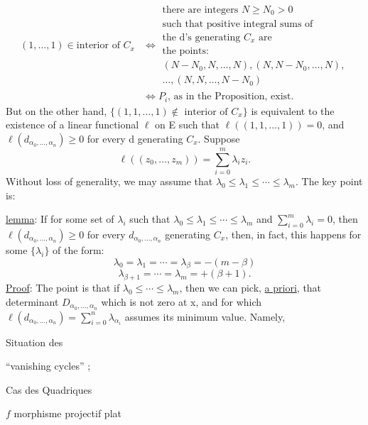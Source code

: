 \[
\begin{aligned}
(1,\ldots,1)\in\text{interior of }C_x
&\Longleftrightarrow
\begin{gathered}
\text{there are integers }N\ge N_0>0\\
\text{such that positive integral sums of}\\
\text{the d's generating }C_x\text{ are}\\
\text{the points:}\\
(N-N_0,N,\ldots,N),(N,N-N_0,\ldots,N),\\
\ldots,(N,N,\ldots,N-N_0)
\end{gathered}\\
&\Longleftrightarrow
P_i\text{, as in the Proposition, exist.}
\end{aligned}
\]
But on the other hand, $\{(1,1,\ldots,1)\notin\text{ interior of }C_x\}$ is
equivalent to the existence of a linear functional $\ell$ on E such that
$\ell((1,1,\ldots,1))=0$, and $\ell(d_{\alpha_0,\ldots,\alpha_n})\ge0$ for every d
generating $C_x$. Suppose
\[
\ell((z_0,\ldots,z_m))=\sum_{i=0}^m\lambda_i z_i.
\]
Without loss of generality, we may assume that $\lambda_0\le\lambda_1\le\cdots\le\lambda_m$.
The key point is:

\uline{lemma}: If for some set of $\lambda_i$ such that $\lambda_0\le\lambda_1\le\cdots\le\lambda_m$
and $\displaystyle\sum_{i=0}^m\lambda_i=0$, then
$\ell(d_{\alpha_0,\ldots,\alpha_n})\ge0$ for every $d_{\alpha_0,\ldots,\alpha_n}$
generating $C_x$, then, in fact, this happens for some $\{\lambda_i\}$ of the form:
\[
\lambda_0=\lambda_1=\cdots=\lambda_\beta=-(m-\beta)
\]
\[
\lambda_{\beta+1}=\cdots=\lambda_m=+(\beta+1).
\]
\uline{Proof}: The point is that if $\lambda_0\le\cdots\le\lambda_m$, then we can pick,
\uline{a priori}, that determinant $D_{\alpha_0,\ldots,\alpha_n}$ which is not zero at x, and
for which $\ell(d_{\alpha_0,\ldots,\alpha_n})=\displaystyle\sum_{i=0}^n\lambda_{\alpha_i}$
assumes its minimum value. Namely,

Situation des

``vanishing cycles'' ;


Cas des Quadriques

$f$ morphisme projectif plat

